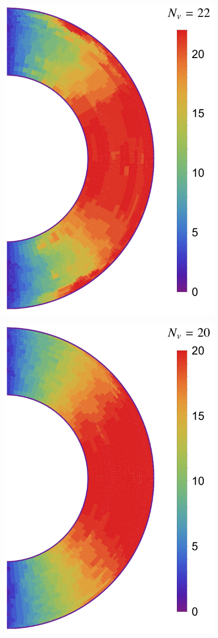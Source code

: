 \documentclass[extra]{gji}
\begin{document}
\begin{figure}
  \centering
  \begin{minipage}{0.4\textwidth}
    \centering
    \includegraphics[height=.9\textwidth]{fig/model/s3nv.pdf} 
    \label{fig:s3nv}\par \medskip \vfill
    \includegraphics[height=.9\textwidth]{fig/model/s2nv.pdf} 

\end{minipage}
\end{figure}
\end{document}

